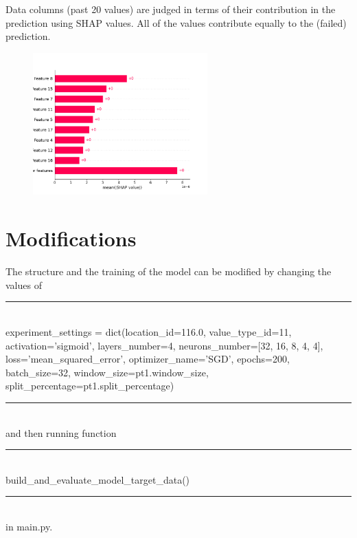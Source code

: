 \documentclass{foxelas_report}
\begin{document}
Data columns (past 20 values) are judged in terms of their contribution in the prediction using SHAP values. All of the values contribute equally to the (failed) prediction. 

\begin{figure}[H]
\includegraphics[width=0.6\textwidth]{case2_shap_values.png}
\end{figure}

\section{Modifications}
The structure and the training of the model can be modified by changing the values of \\ 

\noindent\rule{17cm}{0.4pt}\\
experiment\_settings = dict(location\_id=116.0, value\_type\_id=11, activation='sigmoid', layers\_number=4, neurons\_number=[32, 16, 8, 4, 4], loss='mean\_squared\_error', optimizer\_name='SGD', epochs=200,                     batch\_size=32, window\_size=pt1.window\_size, split\_percentage=pt1.split\_percentage)
\noindent\rule{17cm}{0.4pt}\\

and then running function\\

\noindent\rule{17cm}{0.4pt}\\
build\_and\_evaluate\_model\_target\_data()\\
\noindent\rule{17cm}{0.4pt}\\

in main.py.


%
%
\end{document}
